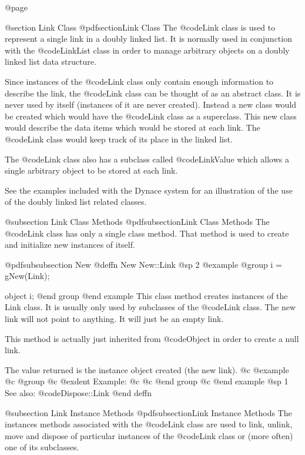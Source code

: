 @page

@section Link Class
@pdfsection{Link Class}
The @code{Link} class is used to represent a single link in a doubly
linked list.  It is normally used in conjunction with the
@code{LinkList} class in order to manage arbitrary objects on a doubly
linked list data structure.

Since instances of the @code{Link} class only contain enough information
to describe the link, the @code{Link} class can be thought of as an
abstract class.  It is never used by itself (instances of it are never
created).  Instead a new class would be created which would have the
@code{Link} class as a superclass.  This new class would describe
the data items which would be stored at each link.  The @code{Link}
class would keep track of its place in the linked list.

The @code{Link} class also has a subclass called @code{LinkValue} which
allows a single arbitrary object to be stored at each link.

See the examples included with the Dynace system for an illustration of the
use of the doubly linked list related classes.


@subsection Link Class Methods
@pdfsubsection{Link Class Methods}
The @code{Link} class has only a single class method.  That method is used
to create and initialize new instances of itself.




@pdfsubsubsection {New}
@deffn {New} New::Link
@sp 2
@example
@group
i = gNew(Link);

object  i;
@end group
@end example
This class method creates instances of the Link class.  It is usually
only used by subclasses of the @code{Link} class.  The new link
will not point to anything.  It will just be an empty link.

This method is actually just inherited from @code{Object} in order
to create a null link.

The value returned is the instance object created (the new link).
@c @example
@c @group
@c @exdent Example:
@c 
@c @end group
@c @end example
@sp 1
See also:  @code{Dispose::Link}
@end deffn





@subsection Link Instance Methods
@pdfsubsection{Link Instance Methods}
The instances methods associated with the @code{Link} class are used to
link, unlink, move and dispose of particular instances of the
@code{Link} class or (more often) one of its subclasses.
















